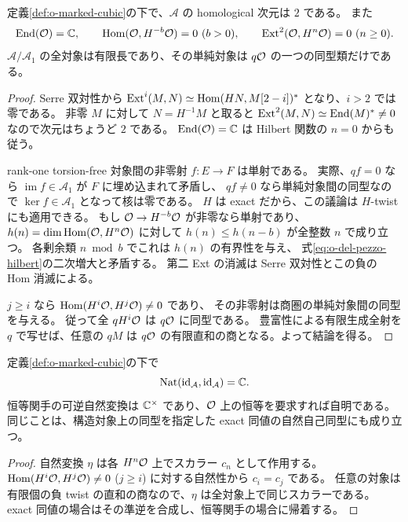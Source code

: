 \begin{lemma}[最小公理から従う消滅と次元]
\label{lem:o-minimal-consequences}
定義\ref{def:o-marked-cubic}の下で、$\mathcal A$ の homological 次元は $2$ である。
また
\begin{equation}\label{eq:o-minimal-vanishing}
 \operatorname{End}(\mathcal O)=\mathbb C,\qquad
 \operatorname{Hom}(\mathcal O,H^{-b}\mathcal O)=0\ (b>0),\qquad
 \operatorname{Ext}^2(\mathcal O,H^n\mathcal O)=0\ (n\ge0).
\end{equation}
$\mathcal A/\mathcal A_1$ の全対象は有限長であり、その単純対象は
$q\mathcal O$ の一つの同型類だけである。
\end{lemma}
\begin{proof}
Serre 双対性から
$\operatorname{Ext}^i(M,N)\simeq\operatorname{Hom}(HN,M[2-i])^*$ となり、$i>2$ では零である。
非零 $M$ に対して $N=H^{-1}M$ と取ると
$\operatorname{Ext}^2(M,N)\simeq\operatorname{End}(M)^*\ne0$ なので次元はちょうど $2$ である。
$\operatorname{End}(\mathcal O)=\mathbb C$ は Hilbert 関数の $n=0$ からも従う。

rank-one torsion-free 対象間の非零射 $f:E\to F$ は単射である。
実際、$qf=0$ なら $\operatorname{im}f\in\mathcal A_1$ が $F$ に埋め込まれて矛盾し、
$qf\ne0$ なら単純対象間の同型なので $\ker f\in\mathcal A_1$ となって核は零である。
$H$ は exact だから、この議論は $H$-twist にも適用できる。
もし $\mathcal O\to H^{-b}\mathcal O$ が非零なら単射であり、
$h(n)=\dim\operatorname{Hom}(\mathcal O,H^n\mathcal O)$ に対して $h(n)\le h(n-b)$ が全整数 $n$ で成り立つ。
各剰余類 $n\bmod b$ でこれは $h(n)$ の有界性を与え、
式\eqref{eq:o-del-pezzo-hilbert}の二次増大と矛盾する。
第二 Ext の消滅は Serre 双対性とこの負の Hom 消滅による。

$j\ge i$ なら $\operatorname{Hom}(H^i\mathcal O,H^j\mathcal O)\ne0$ であり、
その非零射は商圏の単純対象間の同型を与える。
従って全 $qH^i\mathcal O$ は $q\mathcal O$ に同型である。
豊富性による有限生成全射を $q$ で写せば、任意の $qM$ は
$q\mathcal O$ の有限直和の商となる。よって結論を得る。
\end{proof}

\begin{lemma}[中心と自然自己同型]\label{lem:dimension-centre}
定義\ref{def:o-marked-cubic}の下で
\[
 \operatorname{Nat}(\mathrm{id}_{\mathcal A},\mathrm{id}_{\mathcal A})=\mathbb C.
\]
恒等関手の可逆自然変換は $\mathbb C^\times$ であり、$\mathcal O$ 上の恒等を要求すれば自明である。
同じことは、構造対象上の同型を指定した exact 同値の自然自己同型にも成り立つ。
\end{lemma}
\begin{proof}
自然変換 $\eta$ は各 $H^n\mathcal O$ 上でスカラー $c_n$ として作用する。
$\operatorname{Hom}(H^i\mathcal O,H^j\mathcal O)\ne0$ ($j\ge i$) に対する自然性から $c_i=c_j$ である。
任意の対象は有限個の負 twist の直和の商なので、$\eta$ は全対象上で同じスカラーである。
exact 同値の場合はその準逆を合成し、恒等関手の場合に帰着する。
\end{proof}

